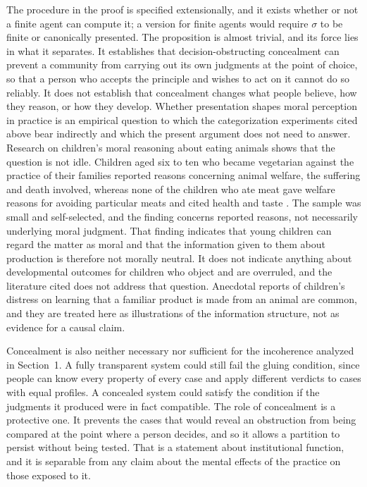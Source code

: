 \documentclass[11pt]{article}
\theoremstyle{definition}
\theoremstyle{plain}
\theoremstyle{definition}
\begin{document}
The procedure in the proof is specified extensionally, and it exists whether or not a finite agent can compute it; a version for finite agents would require $\sigma$ to be finite or canonically presented. The proposition is almost trivial, and its force lies in what it separates. It establishes that decision-obstructing concealment can prevent a community from carrying out its own judgments at the point of choice, so that a person who accepts the principle and wishes to act on it cannot do so reliably. It does not establish that concealment changes what people believe, how they reason, or how they develop. Whether presentation shapes moral perception in practice is an empirical question to which the categorization experiments cited above bear indirectly and which the present argument does not need to answer. Research on children's moral reasoning about eating animals shows that the question is not idle. Children aged six to ten who became vegetarian against the practice of their families reported reasons concerning animal welfare, the suffering and death involved, whereas none of the children who ate meat gave welfare reasons for avoiding particular meats and cited health and taste \cite{hussar2010}. The sample was small and self-selected, and the finding concerns reported reasons, not necessarily underlying moral judgment. That finding indicates that young children can regard the matter as moral and that the information given to them about production is therefore not morally neutral. It does not indicate anything about developmental outcomes for children who object and are overruled, and the literature cited does not address that question. Anecdotal reports of children's distress on learning that a familiar product is made from an animal are common, and they are treated here as illustrations of the information structure, not as evidence for a causal claim.

Concealment is also neither necessary nor sufficient for the incoherence analyzed in Section~1. A fully transparent system could still fail the gluing condition, since people can know every property of every case and apply different verdicts to cases with equal profiles. A concealed system could satisfy the condition if the judgments it produced were in fact compatible. The role of concealment is a protective one. It prevents the cases that would reveal an obstruction from being compared at the point where a person decides, and so it allows a partition to persist without being tested. That is a statement about institutional function, and it is separable from any claim about the mental effects of the practice on those exposed to it.
\end{document}
